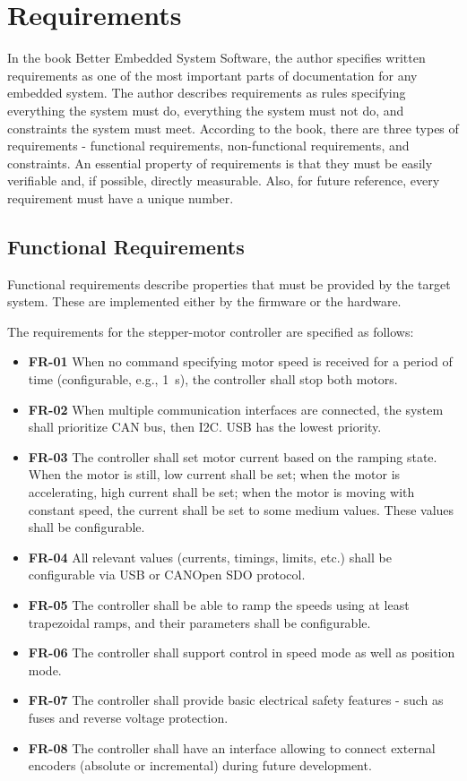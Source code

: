 \section{Requirements}
\label{sec:requirements}
In the book Better Embedded System Software\cite{koopman_better_2010}, the author specifies written requirements as one of the most important parts of documentation for any embedded system.
The author describes requirements as rules specifying everything the system must do, everything the system must not do, and constraints the system must meet.
According to the book, there are three types of requirements - functional requirements, non-functional requirements, and constraints.
An essential property of requirements is that they must be easily verifiable and, if possible, directly measurable.
Also, for future reference, every requirement must have a unique number.

\subsection{Functional Requirements}
\label{subsec:func_req}
Functional requirements describe properties that must be provided by the target system.
These are implemented either by the firmware or the hardware.

The requirements for the stepper-motor controller are specified as follows:

\begin{itemize}
    \item \textbf{FR-01} When no command specifying motor speed is received for a period of time (configurable, e.g., 1~s), the controller shall stop both motors.
    \item \textbf{FR-02} When multiple communication interfaces are connected, the system shall prioritize CAN bus, then I2C. USB has the lowest priority.
    \item \textbf{FR-03} The controller shall set motor current based on the ramping state.
    When the motor is still, low current shall be set; when the motor is accelerating, high current shall be set; when the motor is moving with constant speed, the current shall be set to some medium values.
    These values shall be configurable.
    \item \textbf{FR-04} All relevant values (currents, timings, limits, etc.) shall be configurable via USB or CANOpen SDO protocol.
    \item \textbf{FR-05} The controller shall be able to ramp the speeds using at least trapezoidal ramps, and their parameters shall be configurable.
    \item \textbf{FR-06} The controller shall support control in speed mode as well as position mode.
    \item \textbf{FR-07} The controller shall provide basic electrical safety features - such as fuses and reverse voltage protection.
    \item \textbf{FR-08} The controller shall have an interface allowing to connect external encoders (absolute or incremental) during future development.
\end{itemize}

